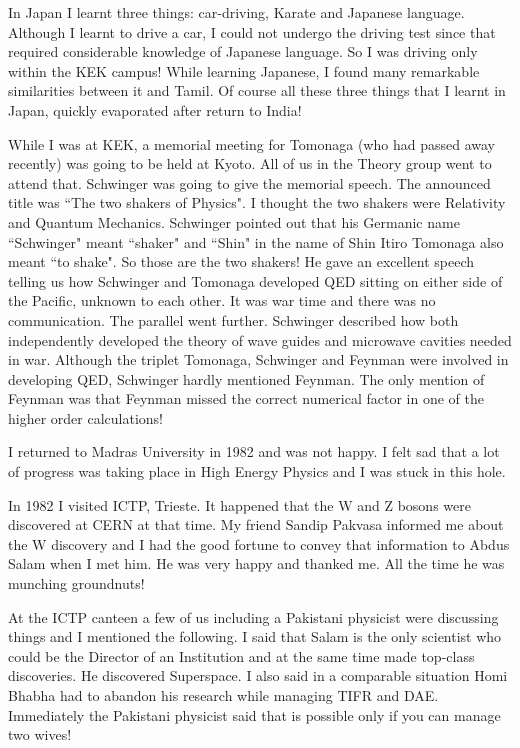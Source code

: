 In Japan I learnt three things: car-driving, Karate and Japanese 
language. Although I learnt to drive a car, I could not undergo the 
driving test since that required considerable knowledge of Japanese 
language. So I was driving only within the KEK campus! While learning 
Japanese, I found many remarkable similarities between it and Tamil. Of 
course all these three things that I learnt in Japan, quickly evaporated 
after return to India!
\medskip

While I was at KEK, a memorial meeting for Tomonaga (who had passed away 
recently) was going to be held at Kyoto. All of us in the Theory group 
went to attend that. Schwinger was going to give the memorial speech. 
The announced title was ``The two shakers of Physics". I thought the two 
shakers were Relativity and Quantum Mechanics. Schwinger pointed out 
that his Germanic name ``Schwinger" meant ``shaker" and ``Shin" in the name 
of Shin Itiro Tomonaga also meant ``to shake". So those are the two 
shakers! He gave an excellent speech telling us how Schwinger and 
Tomonaga developed QED sitting on either side of the Pacific, unknown to 
each other. It was war time and there was no communication. The parallel 
went further. Schwinger described how both independently developed the 
theory of wave guides and microwave cavities needed in war. Although the 
triplet Tomonaga, Schwinger and Feynman were involved in developing QED, 
Schwinger hardly mentioned Feynman. The only mention of Feynman was that 
Feynman missed the correct numerical factor in one of the higher order 
calculations!
 
I returned to Madras University in 1982 and was not happy. I felt sad 
that a lot of progress was taking place in High Energy Physics and I was 
stuck in this hole.

In 1982 I visited ICTP, Trieste. It happened that the W and Z bosons 
were discovered at CERN at that time. My friend Sandip Pakvasa informed 
me about the W discovery and I had the good fortune to convey that 
information to Abdus Salam when I met him. He was very happy and thanked 
me. All the time he was munching groundnuts!

At the ICTP canteen a few of us including a Pakistani physicist were 
discussing things and I mentioned the following. I said that Salam is 
the only scientist who could be the Director of an Institution and at 
the same time made top-class discoveries. He discovered Superspace. I 
also said in a comparable situation Homi Bhabha had to abandon his 
research while managing TIFR and DAE. Immediately the Pakistani 
physicist said that is possible only if you can manage two wives!

